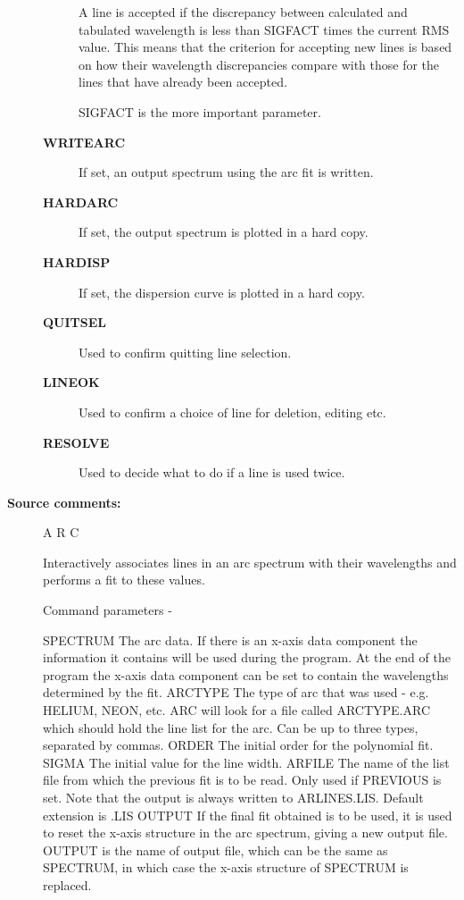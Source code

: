 \begin{description}
\begin{description}
 A line is accepted if the discrepancy between calculated and
 tabulated wavelength is less than SIGFACT times the current RMS
 value.  This means that the criterion for accepting new lines
 is based on how their wavelength discrepancies compare with those for
 the lines that have already been accepted.

 SIGFACT is the more important parameter.
\item [\textbf{WRITEARC}]
 If set, an output spectrum using the arc fit is written.
\item [\textbf{HARDARC}]
 If set, the output spectrum is plotted in a hard copy.
\item [\textbf{HARDISP}]
 If set, the dispersion curve is plotted in a hard copy.
\item [\textbf{QUITSEL}]
 Used to confirm quitting line selection.
\item [\textbf{LINEOK}]
 Used to confirm a choice of line for deletion, editing etc.
\item [\textbf{RESOLVE}]
 Used to decide what to do if a line is used twice.
\end{description}

\item [\textbf{Source comments:}]
\begin{terminalv}
 A R C

 Interactively associates lines in an arc spectrum with
 their wavelengths and performs a fit to these values.

 Command parameters -

 SPECTRUM   The arc data. If there is an x-axis data
            component the information it contains will be
            used during the program.  At the end of the
            program the x-axis data component can be set to
            contain the wavelengths determined by the fit.
 ARCTYPE    The type of arc that was used - e.g. HELIUM,
            NEON, etc.  ARC will look for a file called
            ARCTYPE.ARC which should hold the line list for
            the arc.  Can be up to three types, separated by
            commas.
 ORDER      The initial order for the polynomial fit.
 SIGMA      The initial value for the line width.
 ARFILE     The name of the list file from which the previous
            fit is to be read.  Only used if PREVIOUS is
            set.  Note that the output is always written
            to ARLINES.LIS.  Default extension is .LIS
 OUTPUT     If the final fit obtained is to be used, it is
            used to reset the x-axis structure in the arc spectrum,
            giving a new output file.  OUTPUT is the name of
            output file, which can be the same as SPECTRUM, in
            which case the x-axis structure of SPECTRUM is replaced.


\end{terminalv}
\end{description}
